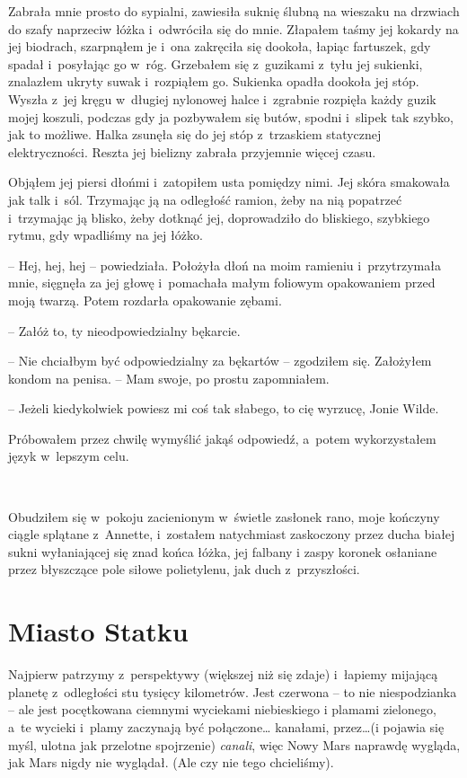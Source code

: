 \documentclass[oneside,polish,11pt,sfheadings]{mwbk}
\begin{document}
Zabrała mnie prosto do sypialni, zawiesiła suknię ślubną na wieszaku na
drzwiach do szafy naprzeciw łóżka i~odwróciła się do mnie. Złapałem
taśmy jej kokardy na jej biodrach, szarpnąłem je i~ona zakręciła się
dookoła, łapiąc fartuszek, gdy spadał i~posyłając go w~róg. Grzebałem
się z~guzikami z~tyłu jej sukienki, znalazłem ukryty suwak i~rozpiąłem
go. Sukienka opadła dookoła jej stóp. Wyszła z~jej kręgu w~długiej
nylonowej halce i~zgrabnie rozpięła każdy guzik mojej koszuli, podczas
gdy ja pozbywałem się butów, spodni i~slipek tak szybko, jak to możliwe.
Halka zsunęła się do jej stóp z~trzaskiem statycznej elektryczności.
Reszta jej bielizny zabrała przyjemnie więcej czasu.

Objąłem jej piersi dłońmi i~zatopiłem usta pomiędzy nimi. Jej skóra
smakowała jak talk i~sól. Trzymając ją na odległość ramion, żeby na nią
popatrzeć i~trzymając ją blisko, żeby dotknąć jej, doprowadziło do
bliskiego, szybkiego rytmu, gdy wpadliśmy na jej łóżko.

-- Hej, hej, hej -- powiedziała. Położyła dłoń na moim ramieniu i~przytrzymała mnie, sięgnęła za jej głowę i~pomachała małym foliowym
opakowaniem przed moją twarzą. Potem rozdarła opakowanie zębami.

-- Załóż to, ty nieodpowiedzialny bękarcie.

-- Nie chciałbym być odpowiedzialny za bękartów -- zgodziłem się.
Założyłem kondom na penisa. -- Mam swoje, po prostu zapomniałem.

-- Jeżeli kiedykolwiek powiesz mi coś tak słabego, to cię wyrzucę, Jonie
Wilde.

Próbowałem przez chwilę wymyślić jakąś odpowiedź, a~potem wykorzystałem
język w~lepszym celu.

~

Obudziłem się w~pokoju zacienionym w~świetle zasłonek rano, moje
kończyny ciągle splątane z~Annette, i~zostałem natychmiast zaskoczony
przez ducha białej sukni wyłaniającej się znad końca łóżka, jej falbany
i zaspy koronek osłaniane przez błyszczące pole siłowe polietylenu, jak
duch z~przyszłości.

\chapter{Miasto Statku}

Najpierw patrzymy z~perspektywy (większej niż się zdaje) i~łapiemy
mijającą planetę z~odległości stu tysięcy kilometrów. Jest czerwona -- to
nie niespodzianka -- ale jest pocętkowana ciemnymi wyciekami niebieskiego
i plamami zielonego, a~te wycieki i~plamy zaczynają być połączone\ldots 
kanałami, przez\ldots (i pojawia się myśl, ulotna jak przelotne spojrzenie)
\emph{canali}, więc Nowy Mars naprawdę wygląda, jak Mars nigdy nie
wyglądał. (Ale czy nie tego chcieliśmy).
\end{document}
